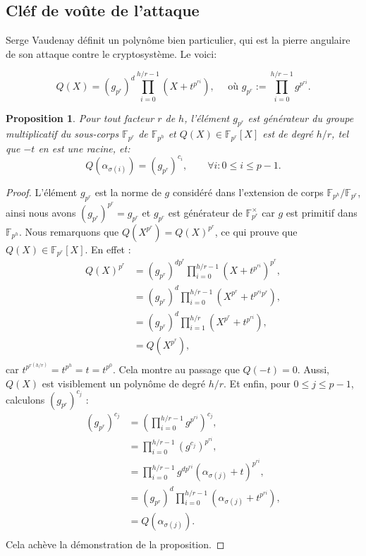 \documentclass[a4paper, titlepage, 11pt]{article}
\newtheorem{prop}[theo]{Proposition}
\theoremstyle{definition}
\theoremstyle{remark}
\def\gf #1{\mathbb{F}_{#1}}
\newcommand{\extension}[2]{{#1} / {#2}} %
\begin{document}
\subsection{Cléf de voûte de l'attaque}\label{s-sec:clefVaudenay}

Serge Vaudenay définit un polynôme bien particulier, qui est la pierre angulaire de son attaque contre le cryptosystème. Le voici:

$$Q(X) = (g_{p^r})^{d} \prod_{i=0}^{h/r-1} \left(X+t^{p^{ri}}\right),
\quad \text{ où } g_{p^r} := \prod_{i=0}^{h/r-1} g^{p^{ri}}.$$

\begin{prop}\label{prop:vaudenay}
Pour tout facteur $r$ de $h$, l'élément $g_{p^r}$ est générateur du groupe multiplicatif du sous-corps $\gf{p^r}$ de $\gf{p^h}$ et $Q(X) \in \gf{p^r}[X]$ est de degré $h/r$, tel que $-t$ en est une racine, et:
$$Q\left(\alpha_{\sigma(i)}\right) = (g_{p^r})^{c_i},\qquad \forall i : 0\leqslant i \leqslant p-1.$$
\end{prop}

\begin{proof}
L'élément $g_{p^r}$ est la norme de $g$ considéré dans l'extension de corps $\extension{\gf{p^h}}{\gf{p^r}}$, ainsi nous avons $( g_{p^r})^{p^r} =  g_{p^r}$ et $ g_{p^r}$ est générateur de $\gf{p^r}^\times$ car $ g$ est primitif dans $\gf{p^h}$. Nous remarquons que $Q\left(X^{p^r}\right) = Q(X)^{p^r}$, ce qui prouve que $Q(X) \in \gf{p^r}[X]$. En effet :
\begin{align*}
Q\left(X\right)^{p^r} &= ( g_{p^r})^{ dp^r} \prod_{i=0}^{h/r-1} \left(X+ t^{p^{ri}}\right)^{p^r}, \\
&= ( g_{p^r})^{ d} \prod_{i=0}^{h/r-1} \left(X^{p^r} +  t^{p^{ri}p^r}\right), \\
&= ( g_{p^r})^{ d} \prod_{i=1}^{h/r} \left(X^{p^r} +  t^{p^{ri}}\right), \\
&= Q\left(X^{p^r}\right), \\
\end{align*}
car $ t^{p^{r(h/r)}} =  t^{p^h} =  t =  t^{p^0}$. Cela montre au passage que $Q(- t) = 0$. Aussi, $Q(X)$ est visiblement un polynôme de degré $h/r$. Et enfin, pour $0\leqslant j \leqslant p-1$, calculons $( g_{p^r})^{c_j}$ :
\begin{align*}
( g_{p^r})^{c_j} &= \left(\prod_{i=0}^{h/r-1}  g^{p^{ri}}\right)^{c_j},\\
&= \prod_{i=0}^{h/r-1} \left( g^{c_j}\right)^{p^{ri}}, \\
&= \prod_{i=0}^{h/r-1}  g^{ dp^{ri}}\left(\alpha_{\sigma(j)} +  t\right)^{p^{ri}},\\
&= ( g_{p^r})^{ d} \prod_{i=0}^{h/r-1} \left(\alpha_{\sigma(j)} +  t^{p^{ri}}\right),\\
&= Q\left(\alpha_{\sigma(j)}\right). \\
\end{align*}
Cela achève la démonstration de la proposition.
\end{proof}
\end{document}
